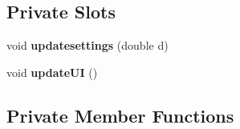 \subsection*{Private Slots}
\begin{DoxyCompactItemize}
\item 
\mbox{\label{classcagecontrol_a244c02598b4b73db82b5852561634084}} 
void {\bfseries updatesettings} (double d)
\item 
\mbox{\label{classcagecontrol_ab6993b1b41f55c164298c1b3e067ab34}} 
void {\bfseries update\+UI} ()
\end{DoxyCompactItemize}
\subsection*{Private Member Functions}

